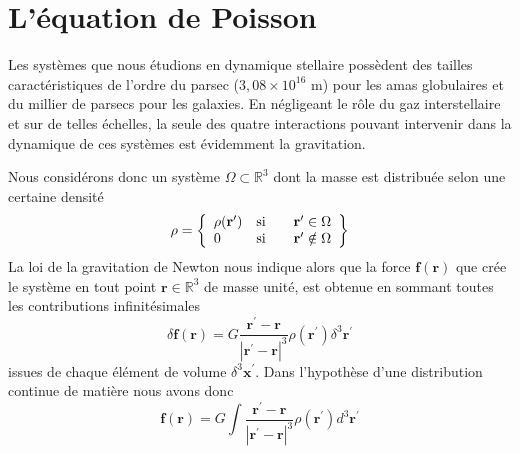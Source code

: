 
\section{{L'\'{e}quation de {Poisson}}}



{Les syst\`{e}mes que nous \'{e}tudions en dynamique stellaire poss\`{e}dent
des tailles carac\-t\'{e}\-ris\-tiques de l'ordre du {parsec} ($3,08\times
10^{16}$ m) pour les amas {globulaire}s et du millier de parsecs pour les
{galaxie}s. En n\'{e}gligeant le r\^{o}le du gaz interstellaire et sur de
telles \'{e}chelles, la seule des quatre interactions pouvant intervenir dans
la dynamique de ces syst\`{e}mes est \'{e}videmment la gravitation. }

{Nous consid\'{e}rons donc un syst\`{e}me $\Omega\subset\mathbb{R}^{3}$ dont
la masse est distribu\'{e}e selon une certaine densit\'{e}
\[
\rho=\left\{
\begin{array}
[c]{l}%
\rho(\mathbf{r}^{\prime})\\
0
\end{array}%
\begin{array}
[c]{l}%
\text{si}\qquad\mathbf{r}^{\prime}\in\Omega\\
\text{si}\qquad\mathbf{r}^{\prime}\notin\Omega
\end{array}
\right\}
\]
La loi de la gravitation de Newton nous indique alors que la force
$\mathbf{f}(\mathbf{r})$ que cr\'{e}e le syst\`{e}me en tout point
$\mathbf{r}\in\mathbb{R}^{3}$ }de masse unit\'{e}{, est obtenue en sommant
toutes les contributions infinit\'{e}simales
\begin{equation}
\delta\mathbf{f}(\mathbf{r})=G\frac{\mathbf{r}^{\prime}-\mathbf{r}}{\left\vert
\mathbf{r}^{\prime}-\mathbf{r}\right\vert ^{3}}\rho(\mathbf{r}^{\prime}%
)\delta^{3}\mathbf{r}^{\prime}\label{poisss}%
\end{equation}
issues de chaque \'{e}l\'{e}ment de volume $\delta^{3}\mathbf{x}^{\prime}$.
Dans l'hypoth\`{e}se d'une distribution continue de mati\`{e}re nous avons
donc
\begin{equation}
\mathbf{f}(\mathbf{r})=G\displaystyle\int\frac{\mathbf{r}^{\prime}-\mathbf{r}%
}{\left\vert \mathbf{r}^{\prime}-\mathbf{r}\right\vert ^{3}}\rho
(\mathbf{r}^{\prime})d^{3}\mathbf{r}^{\prime}\label{eq1}%
\end{equation}
}

